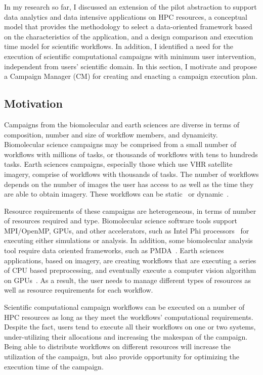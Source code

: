 \label{research}
In my research so far, I discussed an extension of the pilot abstraction to support data analytics and data intensive applications on HPC resources, a conceptual model that provides the methodology to select a data-oriented framework based on the characteristics of the application, and a design comparison and execution time model for scientific workflows.
In addition, I identified a need for the execution of scientific computational campaigns with minimum user intervention, independent from users' scientific domain.
In this section, I motivate and propose a Campaign Manager (CM) for creating and enacting a campaign execution plan.

\subsection{Motivation}
\label{subsec:motivation}
Campaigns from the biomolecular and earth sciences are diverse in terms of composition, number and size of workflow members, and dynamicity.
Biomolecular science campaigns may be comprised from a small number of workflows with millions of tasks, or thousands of workflows with tens to hundreds tasks. 
Earth sciences campaigns, especially those which use VHR satellite imagery, comprise of workflows with thousands of tasks.
The number of workflows depends on the number of images the user has access to as well as the time they are able to obtain imagery.
These workflows can be static~\cite{paraskevakos2019workflow} or dynamic~\cite{dakka2018high}.

Resource requirements of these campaigns are heterogeneous, in terms of number of resources required and type. 
Biomolecular science software tools support MPI/OpenMP, GPUs, and other accelerators, such as Intel Phi processors~\cite{cheatham2015impact} for executing either simulations or analysis. In addition, some biomolecular analysis tool require data oriented frameworks, such as PMDA~\cite{fan2019pmda}.
Earth sciences applications, based on imagery, are creating workflows that are executing a series of CPU based preprocessing, and eventually execute a computer vision algorithm on GPUs~\cite{paraskevakos2019workflow}.
As a result, the user needs to manage different types of resources as well as resource requirements for each workflow.

Scientific computational campaign workflows can be executed on a number of HPC resources as long as they meet the workflows' computational requirements.
Despite the fact, users tend to execute all their workflows on one or two systems, under-utilizing their allocations and increasing the makespan of the campaign.
Being able to distribute workflows on different resources will increase the utilization of the campaign, but also provide opportunity for optimizing the execution time of the campaign.

